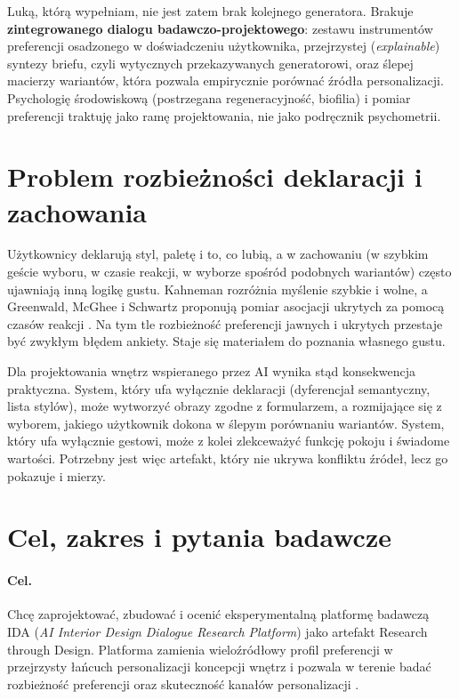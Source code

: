 Luką, którą wypełniam, nie jest zatem brak kolejnego generatora. Brakuje \textbf{zintegrowanego dialogu badawczo-projektowego}: zestawu instrumentów preferencji osadzonego w doświadczeniu użytkownika, przejrzystej (\emph{explainable}) syntezy briefu, czyli wytycznych przekazywanych generatorowi, oraz ślepej macierzy wariantów, która pozwala empirycznie porównać źródła personalizacji.
Psychologię środowiskową (postrzegana regeneracyjność, biofilia) i pomiar preferencji traktuję jako ramę projektowania, nie jako podręcznik psychometrii.

\section{Problem rozbieżności deklaracji i zachowania}
\label{ch01:sec:problem}

Użytkownicy deklarują styl, paletę i to, co lubią, a w zachowaniu (w szybkim geście wyboru, w czasie reakcji, w wyborze spośród podobnych wariantów) często ujawniają inną logikę gustu.
Kahneman rozróżnia myślenie szybkie i wolne, a Greenwald, McGhee i Schwartz proponują pomiar asocjacji ukrytych za pomocą czasów reakcji \parencite{kahneman2011thinking,greenwald1998iat}.
Na tym tle rozbieżność preferencji jawnych i ukrytych przestaje być zwykłym błędem ankiety. Staje się materiałem do poznania własnego gustu.

Dla projektowania wnętrz wspieranego przez AI wynika stąd konsekwencja praktyczna. System, który ufa wyłącznie deklaracji (dyferencjał semantyczny, lista stylów), może wytworzyć obrazy zgodne z formularzem, a rozmijające się z wyborem, jakiego użytkownik dokona w ślepym porównaniu wariantów.
System, który ufa wyłącznie gestowi, może z kolei zlekceważyć funkcję pokoju i świadome wartości.
Potrzebny jest więc artefakt, który nie ukrywa konfliktu źródeł, lecz go pokazuje i mierzy.

\section{Cel, zakres i pytania badawcze}
\label{ch01:sec:cel}

\paragraph{Cel.}
Chcę zaprojektować, zbudować i ocenić eksperymentalną platformę badawczą IDA (\emph{AI Interior Design Dialogue Research Platform}) jako artefakt Research through Design. Platforma zamienia wieloźródłowy profil preferencji w przejrzysty łańcuch personalizacji koncepcji wnętrz i pozwala w terenie badać rozbieżność preferencji oraz skuteczność kanałów personalizacji \parencite{idaPlatform2026}.

